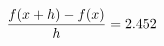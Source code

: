 \documentclass[preview]{standalone}
\begin{document}
\begin{align*}
\special{dvisvgm:raw <g id='unique000'>}\frac{f(x+h)-f(x)}{h} = 2.452\special{dvisvgm:raw </g>}
\end{align*}
\end{document}
